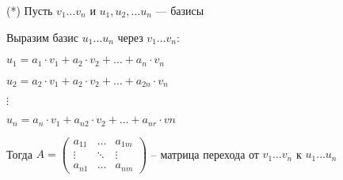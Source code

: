 \begin{definition}
    (*)
    Пусть $v_1 \ldots v_n$ и $u_1, u_2, \ldots u_n$ --- базисы

    Выразим базис $u_1 \ldots u_n$ через $v_1 \ldots v_n$:

    $u_1 = a_1 \cdot v_1 + a_2 \cdot v_2 + \ldots + a_n \cdot v_n$
    
    $u_2 = a_2 \cdot v_1 + a_2 \cdot v_2 + \ldots + a_{2n} \cdot v_n$

    $\vdots$

    $u_n = a_n \cdot v_1 + a_{n2} \cdot v_2 + \ldots + a_{nr} \cdot vn$

    Тогда $A = \left(
        \begin{array}{ccc}
            a_{11} & \ldots & a_{1m}\\
            \vdots & \ddots & \vdots\\
            a_{n1} &\ldots & a_{nm}
        \end{array}
        \right)$ -- матрица перехода от $v_1 \ldots v_n$ к $u_1 \ldots u_n$
        

\end{definition}


